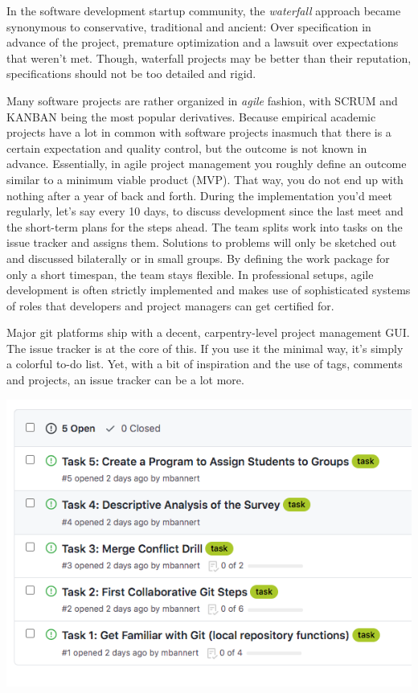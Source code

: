 \documentclass[
  12pt,
  letterpaper,
]{krantz}
\begin{document}
In the software development startup community, the \emph{waterfall}
approach became synonymous to conservative, traditional and ancient:
Over specification in advance of the project, premature optimization and
a lawsuit over expectations that weren't met. Though, waterfall projects
may be better than their reputation, specifications should not be too
detailed and rigid.

Many software projects are rather organized in \emph{agile} fashion,
with SCRUM and KANBAN being the most popular derivatives.
Because empirical academic projects have a lot in common with software
projects inasmuch that there is a certain expectation and quality
control, but the outcome is not known in advance. Essentially, in agile
project management you roughly define an outcome similar to a minimum
viable product (MVP). That way, you do not end up with nothing after a
year of back and forth. During the implementation you'd meet regularly,
let's say every 10 days, to discuss development since the last meet and
the short-term plans for the steps ahead. The team splits work into
tasks on the issue tracker and assigns them. Solutions to problems will
only be sketched out and discussed bilaterally or in small groups. By
defining the work package for only a short timespan, the team stays
flexible. In professional setups, agile development is often strictly
implemented and makes use of sophisticated systems of roles that
developers and project managers can get certified for.

Major git platforms ship with a decent, carpentry-level project
management GUI. The issue tracker is at the
core of this. If you use it the minimal way, it's simply a colorful
to-do list. Yet, with a bit of inspiration and the use of tags, comments
and projects, an issue tracker can be a lot more.

\includegraphics{./images/issue.png}
\end{document}
